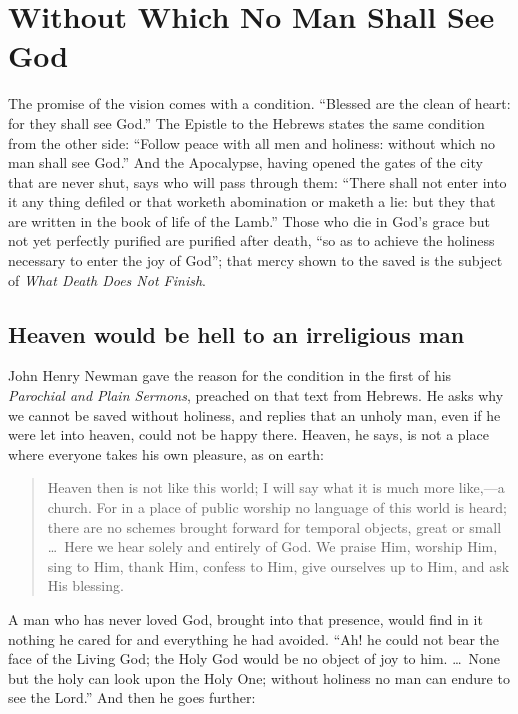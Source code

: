 \section{Without Which No Man Shall See God}

The promise of the vision comes with a condition. ``Blessed are the clean of heart: for they shall see God.'' The Epistle to the Hebrews states the same condition from the other side: ``Follow peace with all men and holiness: without which no man shall see God.'' And the Apocalypse, having opened the gates of the city that are never shut, says who will pass through them: ``There shall not enter into it any thing defiled or that worketh abomination or maketh a lie: but they that are written in the book of life of the Lamb.'' Those who die in God's grace but not yet perfectly purified are purified after death, ``so as to achieve the holiness necessary to enter the joy of God''; that mercy shown to the saved is the subject of \emph{What Death Does Not Finish}.

\subsection{Heaven would be hell to an irreligious man}

John Henry Newman gave the reason for the condition in the first of his \emph{Parochial and Plain Sermons}, preached on that text from Hebrews. He asks why we cannot be saved without holiness, and replies that an unholy man, even if he were let into heaven, could not be happy there. Heaven, he says, is not a place where everyone takes his own pleasure, as on earth:

\begin{quote}
Heaven then is not like this world; I will say what it is much more like,---a church. For in a place of public worship no language of this world is heard; there are no schemes brought forward for temporal objects, great or small \ldots\ Here we hear solely and entirely of God. We praise Him, worship Him, sing to Him, thank Him, confess to Him, give ourselves up to Him, and ask His blessing.
\end{quote}

A man who has never loved God, brought into that presence, would find in it nothing he cared for and everything he had avoided. ``Ah! he could not bear the face of the Living God; the Holy God would be no object of joy to him. \ldots\ None but the holy can look upon the Holy One; without holiness no man can endure to see the Lord.'' And then he goes further:

